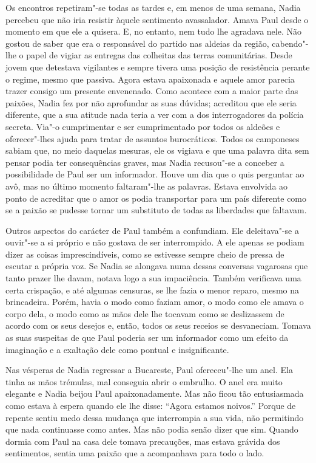 Os encontros repetiram"-se todas as tardes e, em menos de uma semana,
Nadia percebeu que não iria resistir àquele sentimento avassalador.
Amava Paul desde o momento em
que ele a quisera. E, no entanto, nem tudo lhe agradava nele. Não gostou
de saber que era o responsável do partido nas aldeias da região,
cabendo"-lhe o papel de vigiar as entregas das colheitas das terras
comunitárias. Desde jovem que detestava vigilantes e sempre tivera uma
posição de resistência perante o regime, mesmo que passiva. Agora estava
apaixonada e aquele amor parecia trazer consigo um presente envenenado.
Como acontece com a maior parte das paixões, Nadia fez por não
aprofundar as suas dúvidas; acreditou que ele seria diferente, que a sua
atitude nada teria a ver com a dos interrogadores da polícia secreta.
Via"-o cumprimentar e ser cumprimentado por todos os aldeões e
oferecer"-lhes ajuda para tratar de assuntos burocráticos. Todos os
camponeses sabiam que, no meio daquelas mesuras, ele os vigiava e que
uma palavra dita sem pensar podia ter consequências graves, mas Nadia
recusou"-se a conceber a possibilidade de Paul ser um informador. Houve
um dia que o quis perguntar ao avô, mas no último momento faltaram"-lhe
as palavras. Estava envolvida ao ponto de acreditar que o amor os
podia transportar para um país diferente como se a paixão se pudesse
tornar um substituto de todas as liberdades que faltavam.

Outros aspectos do carácter de Paul também a confundiam. Ele deleitava"-se a
ouvir"-se a si próprio e não gostava de ser interrompido. A ele apenas se
podiam dizer as coisas imprescindíveis, como se estivesse sempre cheio
de pressa de escutar a própria voz. Se Nadia se alongava numa dessas
conversas vagarosas que tanto prazer lhe davam, notava logo a sua
impaciência. Também verificava uma certa crispação, e até algumas
censuras, se lhe fazia
o menor reparo, mesmo na brincadeira. Porém, havia o modo como faziam
amor, o modo como ele amava o corpo dela, o modo como as mãos dele lhe
tocavam como se deslizassem de acordo com os seus desejos e, então,
todos os seus receios se desvaneciam. Tomava as suas suspeitas de que
Paul poderia ser um informador como um efeito da imaginação e a
exaltação dele como pontual e insignificante.

Nas vésperas de Nadia regressar a Bucareste, Paul ofereceu"-lhe um anel.
Ela tinha as mãos trémulas, mal conseguia abrir o embrulho. O anel era
muito elegante e Nadia beijou Paul apaixonadamente. Mas não ficou tão
entusiasmada como estava à espera quando ele lhe disse:
``Agora estamos noivos.'' Porque de repente sentiu medo dessa mudança que
interrompia a sua vida, não permitindo que nada continuasse como antes.
Mas não podia senão dizer que sim. Quando dormia com Paul na casa dele
tomava precauções, mas estava grávida dos sentimentos, sentia uma paixão
que a acompanhava para todo o lado.

